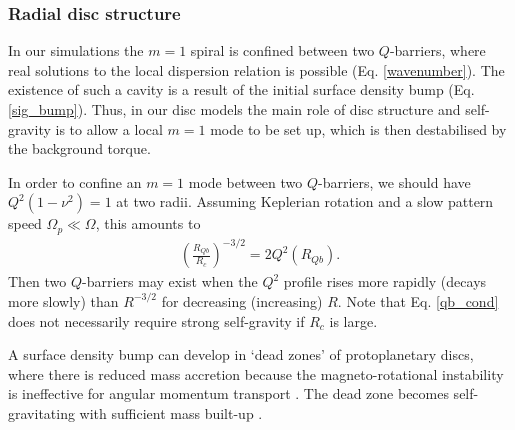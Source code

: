 {  %

  
     
 
  \subsubsection{Radial disc structure}
  In our simulations the 
  $m=1$ spiral is confined between two $Q$-barriers, where real solutions to the local
  dispersion relation is possible (Eq. \ref{wavenumber}). The
  existence of such a cavity is a result of the initial surface
  density bump (Eq. \ref{sig_bump}).  
  Thus, in our disc models the main role of disc structure 
  and self-gravity is to allow a local $m=1$ mode to be set up, which is then 
  destabilised by the background torque. 
  
  In order to confine an $m=1$ mode between two $Q$-barriers, we
  should have $Q^2(1-\nu^2)=1$ at two radii. Assuming 
  Keplerian rotation and a slow pattern speed $\Omega_p\ll\Omega$,
  this amounts to 
  \begin{align}\label{qb_cond}
    \left(\frac{R_{Qb}}{R_c}\right)^{-3/2} = 2Q^2(R_{Qb}). 
  \end{align}
  Then two $Q$-barriers may exist when the $Q^2$ profile
  rises more rapidly (decays more slowly) than $R^{-3/2}$
  for decreasing (increasing) $R$. Note that 
  Eq. \ref{qb_cond} does not necessarily require strong self-gravity
  if $R_c$ is large. 
  
  A surface density bump can develop in 
  `dead zones' of protoplanetary 
  discs, where there is reduced mass accretion because the magneto-rotational 
  instability is ineffective for angular momentum transport 
  \citep{gammie96,turner08,landry13}. The dead zone becomes 
  self-gravitating with sufficient mass built-up 
  \citep{armitage01,martin12,martin12b,zhu09,zhu10,zhu10b,bae13}.  
  
}
